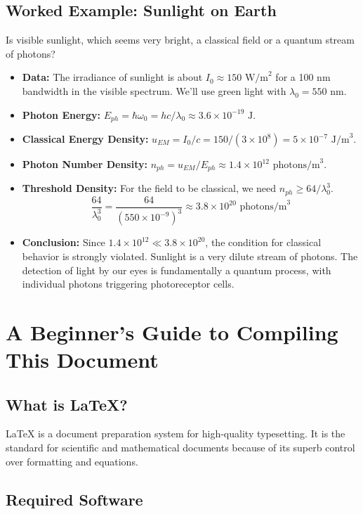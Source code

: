 \documentclass[11pt,a4paper]{article}
\begin{document}
\subsection{Worked Example: Sunlight on Earth}

Is visible sunlight, which seems very bright, a classical field or a quantum stream of photons?
\begin{itemize}
    \item \textbf{Data:} The irradiance of sunlight is about \(I_{0}\approx150 \text{ W/m}^{2}\) for a 100 nm bandwidth in the visible spectrum. We'll use green light with \(\lambda_{0}=550 \text{ nm}\).
    \item \textbf{Photon Energy:} \(E_{ph}=\hbar\omega_{0}=hc/\lambda_{0}\approx3.6\times10^{-19}\text{ J}\).
    \item \textbf{Classical Energy Density:} \(u_{EM}=I_{0}/c=150/(3\times10^{8})=5\times10^{-7}\text{ J/m}^{3}\).
    \item \textbf{Photon Number Density:} \(n_{ph}=u_{EM}/E_{ph}\approx1.4\times10^{12}\text{ photons/m}^{3}\).
    \item \textbf{Threshold Density:} For the field to be classical, we need \(n_{ph}\ge64/\lambda_{0}^{3}\).
    \[
        \frac{64}{\lambda_{0}^{3}}=\frac{64}{(550\times10^{-9})^{3}}\approx3.8\times10^{20}\text{ photons/m}^{3}
    \]
    \item \textbf{Conclusion:} Since \(1.4\times10^{12}\ll3.8\times10^{20}\), the condition for classical behavior is strongly violated. Sunlight is a very dilute stream of photons. The detection of light by our eyes is fundamentally a quantum process, with individual photons triggering photoreceptor cells.
\end{itemize}

\appendix
\section{A Beginner's Guide to Compiling This Document}

\subsection{What is \LaTeX?}

\LaTeX{} is a document preparation system for high-quality typesetting. It is the standard for scientific and mathematical documents because of its superb control over formatting and equations.

\subsection{Required Software}
\end{document}
